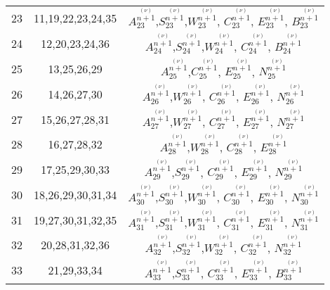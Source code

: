 \begin{center}
\begin{longtable}[htbp]{c c c}
		23	&	11,19,22,23,24,35	&	$A^{\stackrel{(\nu)}{n+1}}_{23}$,$S^{\stackrel{(\nu)}{n+1}}_{23}$,$W^{\stackrel{(\nu)}{n+1}}_{23}$, $C^{\stackrel{(\nu)}{n+1}}_{23}$, $E^{\stackrel{(\nu)}{n+1}}_{23}$, $B^{\stackrel{(\nu)}{n+1}}_{23}$	\\
		24	&	12,20,23,24,36	&	$A^{\stackrel{(\nu)}{n+1}}_{24}$,$S^{\stackrel{(\nu)}{n+1}}_{24}$,$W^{\stackrel{(\nu)}{n+1}}_{24}$, $C^{\stackrel{(\nu)}{n+1}}_{24}$,  $B^{\stackrel{(\nu)}{n+1}}_{24}$	\\
		25	&	13,25,26,29	&	$A^{\stackrel{(\nu)}{n+1}}_{25}$,$C^{\stackrel{(\nu)}{n+1}}_{25}$, $E^{\stackrel{(\nu)}{n+1}}_{25}$, $N^{\stackrel{(\nu)}{n+1}}_{25}$	\\
		26	&	14,26,27,30	&	$A^{\stackrel{(\nu)}{n+1}}_{26}$,$W^{\stackrel{(\nu)}{n+1}}_{26}$, $C^{\stackrel{(\nu)}{n+1}}_{26}$, $E^{\stackrel{(\nu)}{n+1}}_{26}$, $N^{\stackrel{(\nu)}{n+1}}_{26}$	\\
		27	&	15,26,27,28,31	&	$A^{\stackrel{(\nu)}{n+1}}_{27}$,$W^{\stackrel{(\nu)}{n+1}}_{27}$, $C^{\stackrel{(\nu)}{n+1}}_{27}$, $E^{\stackrel{(\nu)}{n+1}}_{27}$, $N^{\stackrel{(\nu)}{n+1}}_{27}$	\\
		28	&	16,27,28,32	&	$A^{\stackrel{(\nu)}{n+1}}_{28}$,$W^{\stackrel{(\nu)}{n+1}}_{28}$, $C^{\stackrel{(\nu)}{n+1}}_{28}$, $E^{\stackrel{(\nu)}{n+1}}_{28}$	\\
		29	&	17,25,29,30,33	&	$A^{\stackrel{(\nu)}{n+1}}_{29}$,$S^{\stackrel{(\nu)}{n+1}}_{29}$, $C^{\stackrel{(\nu)}{n+1}}_{29}$, $E^{\stackrel{(\nu)}{n+1}}_{29}$, $N^{\stackrel{(\nu)}{n+1}}_{29}$	\\
		30	&	18,26,29,30,31,34	&	$A^{\stackrel{(\nu)}{n+1}}_{30}$,$S^{\stackrel{(\nu)}{n+1}}_{30}$,$W^{\stackrel{(\nu)}{n+1}}_{30}$, $C^{\stackrel{(\nu)}{n+1}}_{30}$, $E^{\stackrel{(\nu)}{n+1}}_{30}$, $N^{\stackrel{(\nu)}{n+1}}_{30}$	\\
		31	&	19,27,30,31,32,35	&	$A^{\stackrel{(\nu)}{n+1}}_{31}$,$S^{\stackrel{(\nu)}{n+1}}_{31}$,$W^{\stackrel{(\nu)}{n+1}}_{31}$, $C^{\stackrel{(\nu)}{n+1}}_{31}$, $E^{\stackrel{(\nu)}{n+1}}_{31}$, $N^{\stackrel{(\nu)}{n+1}}_{31}$	\\
		32	&	20,28,31,32,36	&	$A^{\stackrel{(\nu)}{n+1}}_{32}$,$S^{\stackrel{(\nu)}{n+1}}_{32}$,$W^{\stackrel{(\nu)}{n+1}}_{32}$, $C^{\stackrel{(\nu)}{n+1}}_{32}$, $N^{\stackrel{(\nu)}{n+1}}_{32}$	\\
		33	&	21,29,33,34	&	$A^{\stackrel{(\nu)}{n+1}}_{33}$,$S^{\stackrel{(\nu)}{n+1}}_{33}$, $C^{\stackrel{(\nu)}{n+1}}_{33}$, $E^{\stackrel{(\nu)}{n+1}}_{33}$, $B^{\stackrel{(\nu)}{n+1}}_{33}$	\\

\end{longtable}
\end{center}
